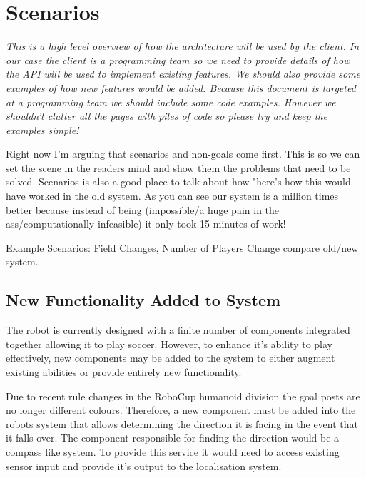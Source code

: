 \documentclass[english,12pt]{scrartcl}
\begin{document}
	\section{Scenarios}
		{\em %
		This is a high level overview of how the architecture will be used by the client. In our
		case the client is a programming team so we need to provide details of how the API will be
		used to implement existing features. We should also provide some examples of how new
		features would be added. Because this document is targeted at a programming team we should
		include some code examples. However we shouldn't clutter all the pages with piles of code so
		please try and keep the examples simple!

		Right now I'm arguing that scenarios and non-goals come first. This is so we can set the
		scene in the readers mind and show them the problems that need to be solved. Scenarios is
		also a good place to talk about how "here's how this would have worked in the old system. As
		you can see our system is a million times better because instead of being (impossible/a huge
		pain in the ass/computationally infeasible) it only took 15 minutes of work!

		Example Scenarios: Field Changes, Number of Players Change compare old/new system.
		}

		\subsection{New Functionality Added to System}
			The robot is currently designed with a finite number of components integrated together
			allowing it to play soccer. However, to enhance it's ability to play effectively, new
			components may be added to the system to either augment existing abilities or provide
			entirely new functionality.

			Due to recent rule changes in the RoboCup humanoid division
			\cite[Section 1.2]{humanoid2013rules} the goal posts are no longer different colours.
			Therefore, a new component must be added into the robots system that allows determining
			the direction it is facing in the event that it falls over. The component responsible
			for finding the direction would be a compass like system. To provide this service it
			would need to access existing sensor input and provide it's output to the localisation
			system.
\end{document}
